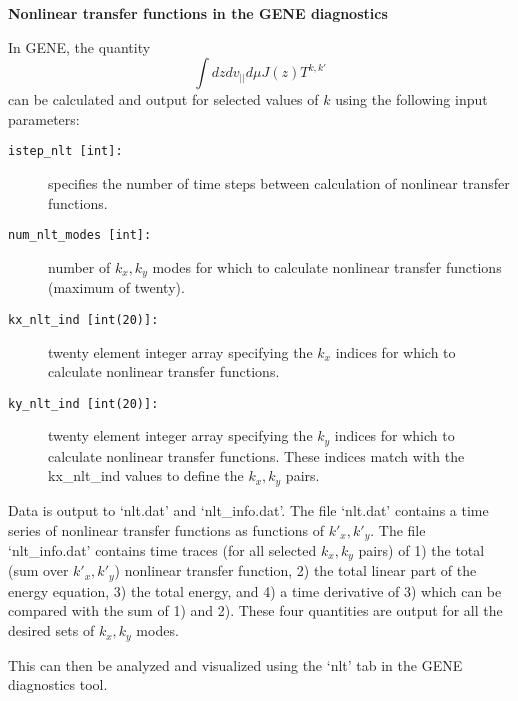 \documentclass[11pt]{article}
\begin{document}
\begin{titlepage}
{\centerline{\bf Nonlinear transfer functions in the GENE diagnostics }
In GENE, the quantity
\begin{equation}
\int dz dv_{||} d\mu J(z) T^{k,k'}
\label{}
\end{equation}
can be calculated and output for selected values of $k$ using the following input parameters: 
\begin{description}
\item[\texttt{istep\_nlt [int]:}] specifies the number of time steps between calculation of nonlinear transfer functions.
\item[\texttt{num\_nlt\_modes [int]:}] number of $k_x,k_y$ modes for which to calculate nonlinear transfer functions (maximum of twenty).
\item[\texttt{kx\_nlt\_ind [int(20)]:}] twenty element integer array specifying the $k_x$ indices for which to calculate nonlinear transfer functions.
\item[\texttt{ky\_nlt\_ind [int(20)]:}] twenty element integer array specifying the $k_y$ indices for which to calculate nonlinear transfer functions.  These indices match with the kx\_nlt\_ind values to define the $k_x,k_y$ pairs.
\end{description}
Data is output to `nlt.dat' and `nlt\_info.dat'.  The file `nlt.dat' contains a time series of nonlinear transfer functions as functions of $k'_x,k'_y$.  The file `nlt\_info.dat' contains time traces (for all selected $k_x,k_y$ pairs) of 1) the total (sum over $k'_x,k'_y$) nonlinear transfer function, 2) the total linear part of the energy equation, 3) the total energy, and 4) a time derivative of 3) which can be compared with the sum of 1) and 2).  These four quantities are output for all the desired sets of $k_x,k_y$ modes.   

This can then be analyzed and visualized using the `nlt' tab in the GENE diagnostics tool.





}
\end{titlepage}
\end{document}
